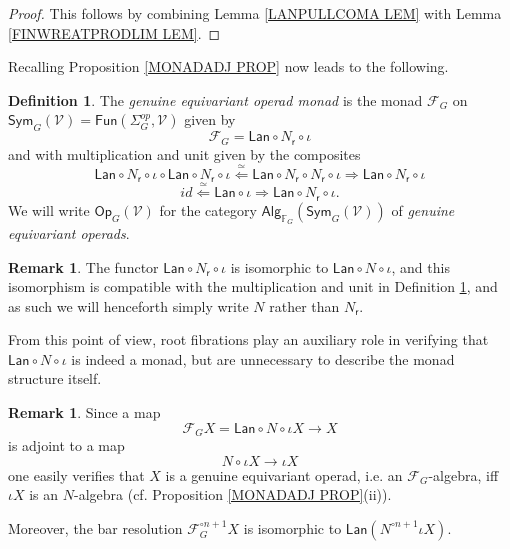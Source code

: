 \documentclass[a4paper,10pt
,draft
]{article}%
\numberwithin{equation}{section}
\numberwithin{figure}{section}
\theoremstyle{definition} %
\newtheorem{definition}[equation]{Definition}%
\newtheorem{remark}[equation]{Remark}%
\newcommand{\Op}{\mathsf{Op}}%
\newcommand{\F}{\ensuremath{\mathcal F}}
\newcommand{\V}{\ensuremath{\mathcal V}}
\newcommand{\1}{\ensuremath{\mathbbm 1}}%
\begin{document}
\begin{proof}
This follows by combining Lemma \ref{LANPULLCOMA LEM} with Lemma \ref{FINWREATPRODLIM LEM}.
\end{proof}

Recalling Proposition \ref{MONADADJ PROP} now leads to the following.
\begin{definition}\label{THEMONAD DEF}
The \textit{genuine equivariant operad monad} is the monad
$\F_G$ on $\mathsf{Sym}_G(\mathcal{V})=\mathsf{Fun}(\Sigma_G^{op}, \mathcal{V})$
given by
\[
	\F_G = \mathsf{Lan} \circ N_{\mathsf{r}} \circ \iota
\]
and with multiplication and unit given by the composites
\[
\mathsf{Lan} \circ N_{\mathsf{r}} \circ \iota \circ
\mathsf{Lan} \circ N_{\mathsf{r}} \circ \iota
\overset{\simeq}{\Leftarrow}
\mathsf{Lan} \circ N_{\mathsf{r}} \circ  N_{\mathsf{r}} \circ \iota
\Rightarrow
\mathsf{Lan} \circ N_{\mathsf{r}} \circ \iota
\]
\[
id \overset{\simeq}{\Leftarrow} \mathsf{Lan} \circ \iota
\Rightarrow
\mathsf{Lan} \circ N_{\mathsf{r}} \circ \iota.
\]
We will write $\Op_G(\V)$ for the category 
$\mathsf{Alg}_{\mathbb{F}_G}(\mathsf{Sym}_G(\mathcal{V}))$ of \textit{genuine equivariant operads}.
\end{definition}

\begin{remark}
	The functor $\mathsf{Lan} \circ N_{\mathsf{r}} \circ \iota$ is isomorphic to 
	$\mathsf{Lan} \circ N \circ \iota$, and this isomorphism is compatible with the multiplication and unit	in Definition \ref{THEMONAD DEF}, and as such we will henceforth simply write $N$ rather than $N_{\mathsf{r}}$.
	
	From this point of view, root fibrations play an auxiliary role in verifying that $\mathsf{Lan} \circ N \circ \iota$ is indeed a monad, but are unnecessary to describe the monad structure itself.
\end{remark}

\begin{remark}\label{REPACKAGERES REM}
Since a map 
\[\F_G X =\mathsf{Lan} \circ N \circ \iota X \to X\]
is adjoint to a map
\[N \circ \iota X \to \iota X \]
one easily verifies that 
$X$ is a genuine equivariant operad, i.e. 
an $\F_G$-algebra, iff 
$\iota X$ is an $N$-algebra
(cf. Proposition \ref{MONADADJ PROP}(ii)).

Moreover, the bar resolution
$ \F_G^{\circ n +1} X $
is isomorphic to
$
	\mathsf{Lan} \left( N^{\circ n +1} \iota X \right)
$.
\end{remark}
\end{document}
